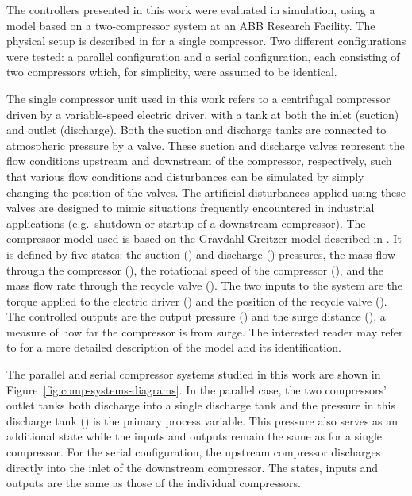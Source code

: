 \label{sec:modelling}
The controllers presented in this work were evaluated in simulation, using a model based on a two-compressor system at an ABB Research Facility. 
The physical setup is described in \cite{Cortinovis2015} for a single compressor.
Two different configurations were tested: a parallel configuration and a serial configuration, each consisting of two compressors which, for simplicity, were assumed to be identical.

The single compressor unit used in this work refers to a centrifugal compressor driven by a variable-speed electric driver, with a tank at both the inlet (suction) and outlet (discharge).
Both the suction and discharge tanks are connected to atmospheric pressure by a valve.
These suction and discharge valves represent the flow conditions upstream and downstream of the compressor, respectively, such that various flow conditions and disturbances can be simulated by simply changing the position of the valves.
The artificial disturbances applied using these valves are designed to mimic situations frequently encountered in industrial applications (e.g.\ shutdown or startup of a downstream compressor).
The compressor model used is based on the Gravdahl-Greitzer model described in \cite{Gravdahl1999}. 
It is defined by five states: the suction () and discharge () pressures, the mass flow through the compressor (), the rotational speed of the compressor (), and the mass flow rate through the recycle valve ().
The two inputs to the system are the torque applied to the electric driver () and the position of the recycle valve ().
The controlled outputs are the output pressure () and the surge distance (), a measure of how far the compressor is from surge.
The interested reader may refer to \cite{Cortinovis2015} for a more detailed description of the model and its identification.

The parallel and serial compressor systems studied in this work are shown in Figure~\ref{fig:comp-systems-diagrams}.
In the parallel case, the two compressors' outlet tanks both discharge into a single discharge tank and the pressure in this discharge tank () is the primary process variable.
This pressure also serves as an additional state while the inputs and outputs remain the same as for a single compressor.
For the serial configuration, the upstream compressor discharges directly into the inlet of the downstream compressor.
The states, inputs and outputs are the same as those of the individual compressors.

